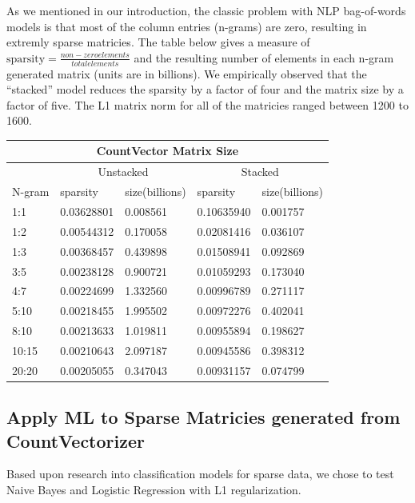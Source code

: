 \documentclass[11pt]{article}
\newcommand{\vertSpace}[1]{\vspace{3mm}}
\begin{document}
{As we mentioned in our introduction, the classic problem with NLP bag-of-words models is that most of the column entries (n-grams) are zero, resulting in extremly sparse matricies.  The table below gives a measure of $\mbox{sparsity} = \frac{non-zero elements}{total elements}$ and the resulting number of elements in each n-gram generated matrix (units are in billions).  We empirically observed that the ``stacked'' model reduces the sparsity by a factor of four and the matrix size by a factor of five. The L1 matrix norm for all of the matricies ranged between 1200 to 1600.\\

\noindent \begin{tabular}{ |p{2cm}||p{2cm}|p{2cm}|p{2cm}|p{2cm}|  }
 \hline
 \multicolumn{5}{|c|}{CountVector Matrix Size} \\
 \hline
 \multicolumn{1}{|c|}{} &
 \multicolumn{2}{|c|}{Unstacked} &
 \multicolumn{2}{|c|}{Stacked}\\
 \hline
 N-gram & sparsity & size(billions) & sparsity & size(billions)\\
 \hline
       1:1& 0.03628801& 0.008561&  0.10635940&   0.001757 \\
       1:2& 0.00544312& 0.170058&  0.02081416&    0.036107\\
       1:3& 0.00368457& 0.439898&  0.01508941&     0.092869\\
       3:5& 0.00238128& 0.900721&  0.01059293&     0.173040\\
       4:7& 0.00224699& 1.332560&  0.00996789&     0.271117\\
      5:10& 0.00218455& 1.995502&  0.00972276&     0.402041\\
      8:10& 0.00213633& 1.019811&  0.00955894&     0.198627\\
     10:15& 0.00210643& 2.097187&  0.00945586&     0.398312\\
     20:20& 0.00205055& 0.347043&  0.00931157&     0.074799\\
 \hline
\end{tabular}





\subsection{Apply ML to Sparse Matricies generated from CountVectorizer}
\noindent
Based upon research into classification models for sparse data, we chose to test Naive Bayes and Logistic Regression with L1 regularization.  \vertSpace

}
\end{document}
